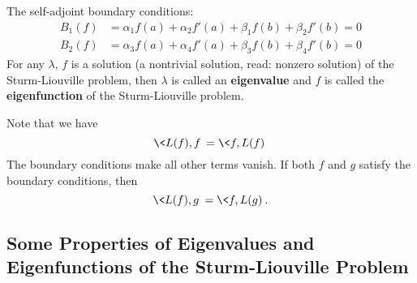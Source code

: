 The self-adjoint boundary conditions:
\begin{subequations}
\begin{align}
B_{1}(f) &= \alpha_{1}f(a) + \alpha_{2}f'(a) + \beta_{1}f(b)+ \beta_{2}f'(b) = 0\\
B_{2}(f) &= \alpha_{3}f(a) + \alpha_{4}f'(a) + \beta_{3}f(b)+ \beta_{4}f'(b) = 0
\end{align}
\end{subequations}
For any $\lambda$, $f$ is a solution (a nontrivial solution,
read: nonzero solution) of the Sturm-Liouville problem, then
$\lambda$ is called an
\textbf{eigenvalue} 
and $f$ is called the
\textbf{eigenfunction} of the Sturm-Liouville problem.

\begin{rmk}
Note that we have
\begin{equation}
\<L(f),f\>=\<f,L(f)\>
\end{equation}
The boundary conditions make all other terms vanish. If both
$f$ and $g$ satisfy the boundary conditions, then 
\begin{equation}
\<L(f),g\> = \<f,L(g)\>.
\end{equation}
\end{rmk}

\subsection[Properties of Sturm-Liouville Problem]{Some Properties of Eigenvalues and Eigenfunctions of the Sturm-Liouville Problem}

